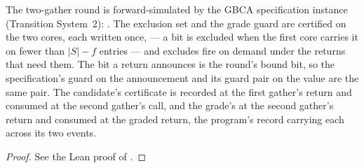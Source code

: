 \begin{theorem}
  \label{thm:gbca-pair-refines}
  \leanok
  The two-gather round is forward-simulated by the GBCA specification instance (Transition System~2): .
  The exclusion set and the grade guard are certified on the two cores, each written once, --- a bit is excluded when the first core carries it on fewer than $|S| - f$ entries --- and excludes fire on demand under the returns that need them.
  The bit a return announces is the round's bound bit, so the specification's guard on the announcement and its guard pair on the value are the same pair.
  The candidate's certificate is recorded at the first gather's return and consumed at the second gather's call, and the grade's at the second gather's return and consumed at the graded return, the program's record carrying each across its two events.
\end{theorem}

\begin{proof}\leanok
  See the Lean proof of .
\end{proof}
